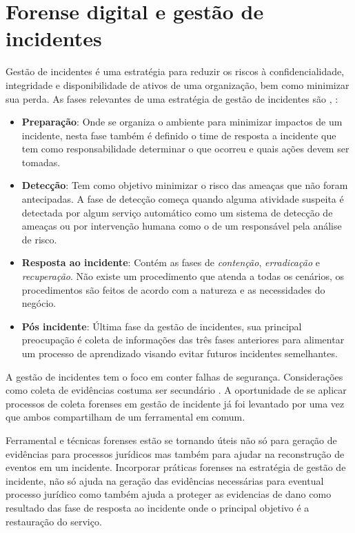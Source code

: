 \section{Forense digital e gestão de incidentes}
\label{sec:forenseeincidentes}

%
Gestão de incidentes é uma estratégia para reduzir os riscos à confidencialidade, integridade e disponibilidade de ativos de uma organização, bem como minimizar sua perda.
%
As fases relevantes de uma estratégia de gestão de incidentes são \cite{AdhiantoFasesGestaoIncidente:2010}, \cite{CichonskiNIST:2012}: 


\begin{itemize}
%
\item \textbf{Preparação}: Onde se organiza o ambiente para minimizar impactos de um incidente, nesta fase também é definido o time de resposta a incidente que tem como responsabilidade determinar o que ocorreu e quais ações devem ser tomadas.
%
\item \textbf{Detecção}: Tem como objetivo minimizar o risco das ameaças que não foram antecipadas. A fase de detecção começa quando alguma atividade suspeita é detectada por algum serviço automático como um sistema de detecção de ameaças ou por intervenção humana como o de um responsável pela análise de risco.
%
\item \textbf{Resposta ao incidente}: Contém as fases de \textit{contenção}, \textit{erradicação} e \textit{recuperação}. Não existe um procedimento que atenda a todas os cenários, os procedimentos são feitos de acordo com a natureza e as necessidades do negócio.
%
\item \textbf{Pós incidente}: Última fase da gestão de incidentes, sua principal preocupação é coleta de informações das três fases anteriores para alimentar um processo de aprendizado visando evitar futuros incidentes semelhantes.

\end{itemize}

A gestão de incidentes tem o foco em conter falhas de segurança. 
%
Considerações como coleta de evidências costuma ser secundário \cite{AdhiantoFasesGestaoIncidente:2010}. 
%
A oportunidade de se aplicar processos de coleta forenses em gestão de incidente já foi levantado por \cite{AdhiantoIncidentHandlingForensic:2016} uma vez que ambos compartilham de um ferramental em comum.
%

%
Ferramental e técnicas forenses estão se tornando úteis não só para geração de evidências para processos jurídicos mas também para ajudar na reconstrução de eventos em um incidente.
%
Incorporar práticas forenses na estratégia de gestão de incidente, não só ajuda na geração das evidências necessárias para eventual processo jurídico como também ajuda a proteger as evidencias de dano como resultado das fase de resposta ao incidente onde o principal objetivo é a restauração do serviço.





